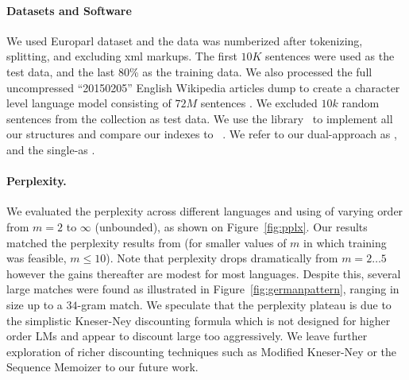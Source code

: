 
\paragraph{Datasets and Software}
We used Europarl dataset and the data was numberized after tokenizing, 
splitting, and excluding xml markups. The first $10K$ sentences were used as 
the test data, and the last 80\% as the training data. We also processed 
the full  uncompressed ``20150205'' English Wikipedia articles dump to 
create a character level language model consisting of $72M$ sentences . We
excluded $10k$ random sentences from the collection as test data.
We use the {} library~\cite{gbmp2014sea} to implement all our 
structures and compare our indexes to \SRILM~\cite{stolcke2002srilm}. We
refer to our dual-\CST approach as \dualCST, and the single-\CST as \singleCST.


\paragraph{Perplexity.}
We evaluated the perplexity across different languages and using \ngrams of varying order from $m=2$ to $\infty$ (unbounded), as shown on Figure~\ref{fig:pplx}.
Our results matched the perplexity results from \SRILM (for smaller values of $m$ in which \SRILM training was feasible, $m \le 10$).
Note that perplexity drops dramatically from $m=2\ldots5$ however the gains thereafter are modest for most languages.
Despite this, several large \ngram matches were found as illustrated in Figure~\ref{fig:germanpattern}, ranging in size up to a $34$-gram match.
We speculate that the perplexity plateau is due to the simplistic Kneser-Ney discounting formula which is not designed for higher order \ngram LMs and appear to discount large \ngrams too aggressively. 
We leave further exploration of richer discounting techniques such as Modified Kneser-Ney \cite{chen_goodman} or the Sequence Memoizer \cite{wood_teh} to our future work.


